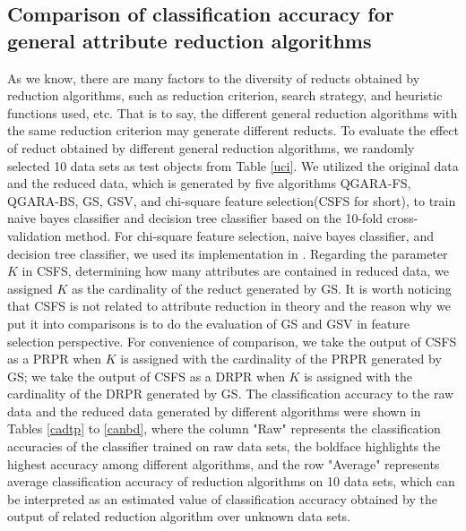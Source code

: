 \documentclass[review]{elsarticle}
\begin{document}
	\subsection{Comparison of classification accuracy for general attribute reduction algorithms}
		\par As we know, there are many factors to the diversity of reducts obtained by reduction algorithms, such as reduction criterion, search strategy, and heuristic functions used, etc. That is to say, the different general reduction algorithms with the same reduction criterion may generate different reducts. To evaluate the effect of reduct obtained by different general reduction algorithms, we randomly selected 10 data sets as test objects from Table \ref{uci}. We utilized the original data and the reduced data, which is generated by five algorithms QGARA-FS, QGARA-BS, GS, GSV, and chi-square feature selection(CSFS for short), to train naive bayes classifier and decision tree classifier based on the 10-fold cross-validation method. For chi-square feature selection, naive bayes classifier, and decision tree classifier, we used its implementation in \cite{scikit-learn}. Regarding the parameter $K$ in CSFS, determining how many attributes are contained in reduced data, we assigned $K$ as the cardinality of the reduct generated by GS. It is worth noticing that CSFS is not related to attribute reduction in theory and the reason why we put it into comparisons is to do the evaluation of GS and GSV in feature selection perspective. For convenience of comparison, we take the output of CSFS as a PRPR when $K$ is assigned with the cardinality of the PRPR generated by GS; we take the output of CSFS as a DRPR when $K$ is assigned with the cardinality of the DRPR generated by GS. The classification accuracy to the raw data and the reduced data generated by different algorithms were shown in Tables \ref{cadtp} to \ref{canbd}, where the column "Raw" represents the classification accuracies of the classifier trained on raw data sets, the boldface highlights the highest accuracy among different algorithms, and the row "Average" represents average classification accuracy of reduction algorithms on 10 data sets, which can be interpreted as an estimated value of classification accuracy obtained by the output of related reduction algorithm over unknown data sets.  
\end{document}
